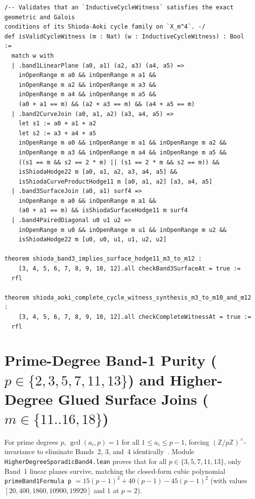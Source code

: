 \documentclass[11pt,a4paper]{article}
\begin{document}
\begin{lstlisting}[caption={Surface Lefschetz $(1,1)$, curve-product $(1,1)$, witness datatype, and round-trip certificates in \texttt{ShiodaInductiveCycleSynthesis.lean}.}]
/-- Validates that an `InductiveCycleWitness` satisfies the exact geometric and Galois
conditions of its Shioda-Aoki cycle family on `X_m^4`. -/
def isValidCycleWitness (m : Nat) (w : InductiveCycleWitness) : Bool :=
  match w with
  | .band1LinearPlane (a0, a1) (a2, a3) (a4, a5) =>
    inOpenRange m a0 && inOpenRange m a1 &&
    inOpenRange m a2 && inOpenRange m a3 &&
    inOpenRange m a4 && inOpenRange m a5 &&
    (a0 + a1 == m) && (a2 + a3 == m) && (a4 + a5 == m)
  | .band2CurveJoin (a0, a1, a2) (a3, a4, a5) =>
    let s1 := a0 + a1 + a2
    let s2 := a3 + a4 + a5
    inOpenRange m a0 && inOpenRange m a1 && inOpenRange m a2 &&
    inOpenRange m a3 && inOpenRange m a4 && inOpenRange m a5 &&
    ((s1 == m && s2 == 2 * m) || (s1 == 2 * m && s2 == m)) &&
    isShiodaHodge22 m [a0, a1, a2, a3, a4, a5] &&
    isShiodaCurveProductHodge11 m [a0, a1, a2] [a3, a4, a5]
  | .band3SurfaceJoin (a0, a1) surf4 =>
    inOpenRange m a0 && inOpenRange m a1 &&
    (a0 + a1 == m) && isShiodaSurfaceHodge11 m surf4
  | .band4PairedDiagonal u0 u1 u2 =>
    inOpenRange m u0 && inOpenRange m u1 && inOpenRange m u2 &&
    isShiodaHodge22 m [u0, u0, u1, u1, u2, u2]

theorem shioda_band3_implies_surface_hodge11_m3_to_m12 :
    [3, 4, 5, 6, 7, 8, 9, 10, 12].all checkBand3SurfaceAt = true :=
  rfl

theorem shioda_aoki_complete_cycle_witness_synthesis_m3_to_m10_and_m12 :
    [3, 4, 5, 6, 7, 8, 9, 10, 12].all checkCompleteWitnessAt = true :=
  rfl
\end{lstlisting}

\section{Prime-Degree Band-1 Purity (\texorpdfstring{$p \in \{2,3,5,7,11,13\}$}{p in {2,3,5,7,11,13}}) and Higher-Degree Glued Surface Joins (\texorpdfstring{$m \in \{11..16, 18\}$}{m in {11..16, 18}})}

For prime degrees $p$, $\gcd(a_i, p) = 1$ for all $1 \le a_i \le p - 1$, forcing $(\mathbb{Z}/p\mathbb{Z})^\times$-invariance to eliminate Bands~2, 3, and~4 identically~\cite{Shioda1979}. Module \texttt{HigherDegreeSporadicBand4.lean} proves that for all $p \in \{3, 5, 7, 11, 13\}$, only Band~1 linear planes survive, matching the closed-form cubic polynomial \texttt{primeBand1Formula p} $= 15(p-1)^3 + 40(p-1) - 45(p-1)^2$ (with values $[20, 400, 1860, 10900, 19920]$ and $1$ at $p = 2$).
\end{document}
